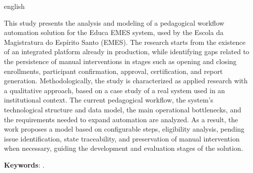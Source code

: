 %
%
%

\setlength{\absparsep}{18pt}
\begin{resumo}[Abstract]
\begin{otherlanguage*}{english}

This study presents the analysis and modeling of a pedagogical workflow
automation solution for the Educa EMES system, used by the Escola da
Magistratura do Espírito Santo (EMES). The research starts from the existence
of an integrated platform already in production, while identifying gaps related
to the persistence of manual interventions in stages such as opening and
closing enrollments, participant confirmation, approval, certification, and
report generation. Methodologically, the study is characterized as applied
research with a qualitative approach, based on a case study of a real system
used in an institutional context. The current pedagogical workflow, the
system's technological structure and data model, the main operational
bottlenecks, and the requirements needed to expand automation are analyzed. As
a result, the work proposes a model based on configurable steps, eligibility
analysis, pending issue identification, state traceability, and preservation of
manual intervention when necessary, guiding the development and evaluation
stages of the solution.
 
\textbf{Keywords}: \imprimirkeywords.
\end{otherlanguage*}
\end{resumo}

